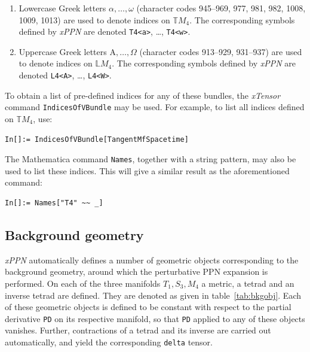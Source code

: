 \documentclass[notitlepage,a4paper,aps,prd,onecolumn,superscriptaddress,nofootinbib,groupedaddress,longbibliography]{revtex4-1}
\newcommand{\xPPN}{\emph{xPPN}}
\newcommand{\xTensor}{\emph{xTensor}}
\begin{document}
\begin{enumerate}
\item
Lowercase Greek letters \(\alpha, \ldots, \omega\) (character codes 945--969, 977, 981, 982, 1008, 1009, 1013) are used to denote indices on \(\mathbb{T}M_4\). The corresponding symbols defined by \xPPN{} are denoted \lstinline/T4<a>/, \ldots, \lstinline/T4<w>/.
\item
Uppercase Greek letters \(\mathrm{A}, \ldots, \Omega\) (character codes 913--929, 931--937) are used to denote indices on \(\mathbb{L}M_4\). The corresponding symbols defined by \xPPN{} are denoted \lstinline/L4<A>/, \ldots, \lstinline/L4<W>/.
\end{enumerate}
To obtain a list of pre-defined indices for any of these bundles, the \xTensor{} command \lstinline/IndicesOfVBundle/ may be used. For example, to list all indices defined on \(\mathbb{T}M_4\), use:
\begin{lstlisting}
In[]:= IndicesOfVBundle[TangentMfSpacetime]
\end{lstlisting}
The Mathematica command \lstinline/Names/, together with a string pattern, may also be used to list these indices. This will give a similar result as the aforementioned command:
\begin{lstlisting}
In[]:= Names["T4" ~~ _]
\end{lstlisting}

\subsection{Background geometry}\label{ssec:background}
\xPPN{} automatically defines a number of geometric objects corresponding to the background geometry, around which the perturbative PPN expansion is performed. On each of the three manifolds \(T_1, S_3, M_4\) a metric, a tetrad and an inverse tetrad are defined. They are denoted as given in table~\ref{tab:bkgobj}. Each of these geometric objects is defined to be constant with respect to the partial derivative \lstinline/PD/ on its respective manifold, so that \lstinline/PD/ applied to any of these objects vanishes. Further, contractions of a tetrad and its inverse are carried out automatically, and yield the corresponding \lstinline/delta/ tensor.
\end{document}
